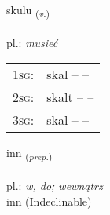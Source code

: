 \documentclass[frontgrid, backgrid]{flacards}\usepackage[]{graphicx}\usepackage[]{xcolor}
\begin{document}
{skulu \small{\textsubscript{(\textit{v.})}} \\[1ex] %
\textphonetic{[skʏːlʏ]} \\
pl.: \emph{musieć} \\  [2ex]
\renewcommand*{\arraystretch}{0.8}
\begin{tabular}{p{1cm}l}
\textsc{1sg}: & skal --  --  \\ 
\textsc{2sg}: & skalt --  --  \\ 
\textsc{3sg}: & skal --  --  \\ 
\end{tabular}
}


\renewcommand{\flhead}{\vskip5pt \fboxsep=0pt {\small\bfseries\footnotesize Forsetning | Preposition}}
\renewcommand{\fcfoot}{\vskip5pt \fboxsep=0pt \hspace{2pt}{\small\bfseries\footnotesize 1K}}

\renewcommand{\blhead}{\vskip5pt {\small\bfseries\footnotesize Forsetning | Preposition }}
\renewcommand{\bcfoot}{\vskip5pt \hspace{2pt}{\small\bfseries\footnotesize 1K}}


{inn \small{\textsubscript{(\textit{prep.})}} \\[1ex]
\textphonetic{[ɪn]} \\
pl.: \emph{w, do; wewnątrz} \\  [2ex]
inn (Indeclinable)}

\renewcommand{\flhead}{\vskip5pt \fboxsep=0pt {\small\bfseries\footnotesize Lýsingarorð | Adjective}}
\renewcommand{\fcfoot}{\vskip5pt \fboxsep=0pt \hspace{2pt}{\small\bfseries\footnotesize 1K}}

\renewcommand{\blhead}{\vskip5pt {\small\bfseries\footnotesize Lýsingarorð | Adjective }}
\renewcommand{\bcfoot}{\vskip5pt \hspace{2pt}{\small\bfseries\footnotesize 1K}}
\end{document}
